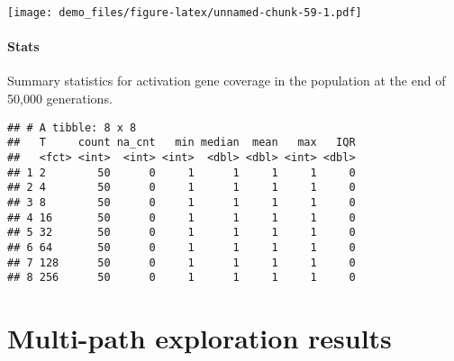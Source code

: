 \documentclass[]{book}
\newenvironment{Shaded}{\begin{snugshade}}{\end{snugshade}}
\newcommand{\DataTypeTok}[1]{\textcolor[rgb]{0.13,0.29,0.53}{#1}}
\newcommand{\KeywordTok}[1]{\textcolor[rgb]{0.13,0.29,0.53}{\textbf{#1}}}
\newcommand{\NormalTok}[1]{#1}
\newcommand{\OperatorTok}[1]{\textcolor[rgb]{0.81,0.36,0.00}{\textbf{#1}}}
\newcommand{\OtherTok}[1]{\textcolor[rgb]{0.56,0.35,0.01}{#1}}
\newcommand{\StringTok}[1]{\textcolor[rgb]{0.31,0.60,0.02}{#1}}
\let\oldparagraph\paragraph
\renewcommand{\paragraph}[1]{\oldparagraph{#1}\mbox{}}
\begin{document}
\texttt{[image: demo\_files/figure-latex/unnamed-chunk-59-1.pdf]}

\hypertarget{stats-33}{%
\paragraph{Stats}\label{stats-33}}

Summary statistics for activation gene coverage in the population at the end of 50,000 generations.

\begin{Shaded}
\end{Shaded}

\begin{verbatim}
## # A tibble: 8 x 8
##   T     count na_cnt   min median  mean   max   IQR
##   <fct> <int>  <int> <int>  <dbl> <dbl> <int> <dbl>
## 1 2        50      0     1      1     1     1     0
## 2 4        50      0     1      1     1     1     0
## 3 8        50      0     1      1     1     1     0
## 4 16       50      0     1      1     1     1     0
## 5 32       50      0     1      1     1     1     0
## 6 64       50      0     1      1     1     1     0
## 7 128      50      0     1      1     1     1     0
## 8 256      50      0     1      1     1     1     0
\end{verbatim}

\hypertarget{multi-path-exploration-results-2}{%
\section{Multi-path exploration results}\label{multi-path-exploration-results-2}}
\end{document}
